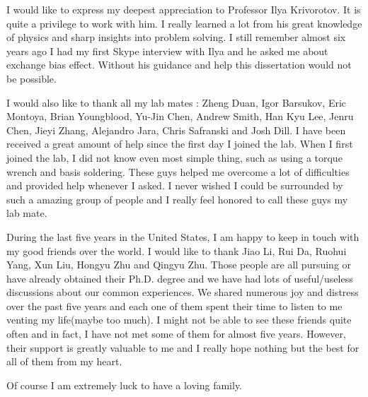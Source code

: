 \acknowledgments
{
  I would like to express my deepest appreciation to Professor Ilya Krivorotov. It is quite a privilege to work with him. I really learned a lot from his great knowledge of physics and sharp insights into problem solving. I still remember almost six years ago I had my first Skype interview with Ilya and he asked me about exchange bias effect. Without his guidance and help this dissertation would not be possible.
  
  I would also like to thank all my lab mates : Zheng Duan, Igor Barsukov, Eric Montoya, Brian Youngblood, Yu-Jin Chen, Andrew  Smith,  Han Kyu Lee, Jenru Chen, Jieyi Zhang,  Alejandro Jara, Chris Safranski and Josh Dill. I have been received a great amount of help since the first day I joined the lab. When I first joined the lab, I did not know even most simple thing, such as using a torque wrench and basis soldering. These guys helped me overcome a lot of difficulties and provided help whenever I asked. I never wished I could be surrounded by such a amazing group of people and I really feel honored to call these guys my lab mate.
  
  During the last five years in the United States, I am happy to keep in touch with my good friends over the world. I would like to thank Jiao Li, Rui Da, Ruohui Yang, Xun Liu, Hongyu Zhu and Qingyu Zhu. Those people are all pursuing or have already obtained their Ph.D. degree and we have had lots of useful/useless discussions about our common experiences. We shared numerous joy and distress over the past five years and each one of them spent their time to listen to me venting my life(maybe too much). I might not be able to see these friends quite often and in fact, I have not met some of them for almost five years. However, their support is greatly valuable to me and I really hope nothing but the best for all of them from my heart.
  
  Of course I am extremely luck to have a loving family.
  
}


\newcommand{\mypubentry}[3]{
  \begin{tabular*}{1\textwidth}{@{\extracolsep{\fill}}p{4.5in}r}
    \textbf{#1} & \textbf{#2} \\ 
    \multicolumn{2}{@{\extracolsep{\fill}}p{.95\textwidth}}{#3}\vspace{6pt} \\
  \end{tabular*}
}
\newcommand{\mysoftentry}[3]{
  \begin{tabular*}{1\textwidth}{@{\extracolsep{\fill}}lr}
    \textbf{#1} & \url{#2} \\
    \multicolumn{2}{@{\extracolsep{\fill}}p{.95\textwidth}}
    {\emph{#3}}\vspace{-6pt} \\
  \end{tabular*}
}

